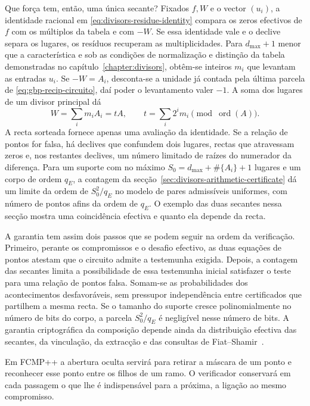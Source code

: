 Que força tem, então, uma única secante? Fixados \(f,W\) e o vector
\((u_i)\), a identidade racional em \eqref{eq:divisors-residue-identity} compara
os zeros efectivos de \(f\) com os múltiplos da tabela e com \(-W\).
Se essa identidade vale e o declive separa os lugares, os resíduos
recuperam as multiplicidades. Para \(d_{\max}+1\) menor que a característica
e sob as condições de normalização e distinção da tabela demonstradas
no capítulo~\ref{chapter:divisors}, obtêm-se inteiros \(m_i\) que
levantam as entradas \(u_i\). Se \(-W=A_i\), desconta-se a unidade
já contada pela última parcela de \eqref{eq:gbp-recip-circuito}, daí
poder o levantamento valer \(-1\).
A soma dos lugares de um divisor principal dá
\[
 W=\sum_i m_i A_i=tA,\qquad t=\sum_i2^i m_i\pmod{\operatorname{ord}(A)}.
\]
A recta sorteada fornece apenas uma avaliação da identidade. Se a
relação de pontos for falsa, há declives que confundem dois lugares,
rectas que atravessam zeros e, nos restantes declives, um número
limitado de raízes do numerador da diferença. Para um suporte com no
máximo \(S_0=d_{\max}+\#\{A_i\}+1\) lugares e um corpo de ordem \(q_E\),
a contagem da secção~\ref{sec:divisors-arithmetic-certificate} dá
um limite da ordem de \(S_0^2/q_E\) no modelo de pares admissíveis
uniformes, com número de pontos afins da ordem de \(q_E\).
O exemplo das duas secantes nessa secção mostra uma coincidência
efectiva e quanto ela depende da recta.

A garantia tem assim dois passos que se podem seguir na ordem da
verificação. Primeiro, perante os compromissos e o desafio efectivo,
as duas equações de pontos atestam que o circuito admite a testemunha
exigida. Depois, a contagem das secantes limita a possibilidade de essa
testemunha inicial satisfazer o teste para uma relação de pontos falsa.
Somam-se as probabilidades dos acontecimentos desfavoráveis, sem
pressupor independência entre certificados que partilhem a mesma recta.
Se o tamanho do suporte cresce polinomialmente no número de bits do
corpo, a parcela \(S_0^2/q_E\) é negligível nesse número de bits.
A garantia criptográfica da composição depende ainda da distribuição
efectiva das secantes, da vinculação, da extracção e das consultas de
Fiat--Shamir~\cite{eagen-divisors,generalized-bulletproofs-fixed,fcmp-plus-plus-paper}.


Em FCMP++ a abertura oculta servirá para retirar a máscara de um ponto
e reconhecer esse ponto entre os filhos de um ramo. O verificador
conservará em cada passagem o que lhe é indispensável para a próxima,
a ligação ao mesmo compromisso.\hypertarget{excerto.generalizadas.fim}{}
